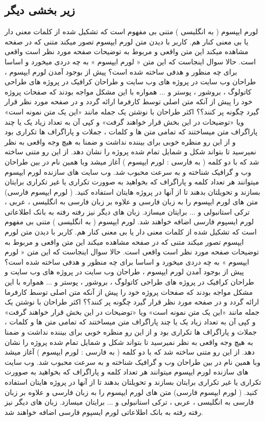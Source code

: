 \subsection{زیر بخشی دیگر}
لورم ایپسوم ( به انگلیسی  ) متنی بی مفهوم است که تشکیل شده از کلمات معنی دار یا بی معنی کنار هم. کاربر با دیدن متن لورم ایپسوم تصور میکند متنی که در صفحه مشاهده میکند این متن واقعی و مربوط به توضیحات صفحه مورد نظر است واقعی است. حالا سوال اینجاست که این متن « لورم ایپسوم » به چه دردی میخورد و اساسا برای چه منظور و هدفی ساخته شده است؟ پیش از بوجود آمدن لورم ایپسوم ، طراحان وب سایت در پروژه های وب سایت و طراحان کرافیک در پروژه های طراحی کاتولوگ ، بروشور ، پوستر و ... همواره با این مشکل مواجه بودند که صفحات پروژه خود را پیش از آنکه متن اصلی توسط کارفرما ارائه گردد و در صفحه مورد نظر قرار گیرد چگونه پر کنند؟؟ اکثر طراحان با نوشتن یک جمله مانند «این یک متن نمونه است» ویا «توضیحات در این بخش قرار خواهند گرفت» و کپی آن به تعداد زیاد یک یا چند پاراگراف متن میساختند که تمامی متن ها و کلمات ، جملات و پاراگراف ها تکراری بود و از این رو منظره خوبی برای بیننده نداشت و ضمنا به هیچ وجه واقعی به نظر نمیرسید تا بتواند شکل و شمایل تمام شده پروژه را نشان دهد. از این رو متنی ساخته شد که با دو کلمه ( به فارسی : لورم ایپسوم ) آغاز میشد وبا همین نام در بین طراحان وب و گرافیک شناخته و به سرعت محبوب شد. وب سایت های سازنده لورم ایپسوم میتوانند هر تعداد کلمه و پاراگراف که بخواهید به صوورت تکراری یا غیر تکراری برایتان بسازند و تحویلتان بدهند تا از آنها در پروژه هایتان استفاده کنید. ( لورم ایپسوم فارسی) متن های لورم ایپسوم را به زبان فارسی و علاوه بر زبان فارسی به انگلیسی ، عربی ، ترکی استانبولی و ... برایتان میسازد. زبان های دیگر نیز رفته رفته به بانک اطلاعاتی لورم ایسپوم فارسی اضافه خواهند شد.  لورم ایپسوم ( به انگلیسی  ) متنی بی مفهوم است که تشکیل شده از کلمات معنی دار یا بی معنی کنار هم. کاربر با دیدن متن لورم ایپسوم تصور میکند متنی که در صفحه مشاهده میکند این متن واقعی و مربوط به توضیحات صفحه مورد نظر است واقعی است. حالا سوال اینجاست که این متن « لورم ایپسوم » به چه دردی میخورد و اساسا برای چه منظور و هدفی ساخته شده است؟ پیش از بوجود آمدن لورم ایپسوم ، طراحان وب سایت در پروژه های وب سایت و طراحان کرافیک در پروژه های طراحی کاتولوگ ، بروشور ، پوستر و ... همواره با این مشکل مواجه بودند که صفحات پروژه خود را پیش از آنکه متن اصلی توسط کارفرما ارائه گردد و در صفحه مورد نظر قرار گیرد چگونه پر کنند؟؟ اکثر طراحان با نوشتن یک جمله مانند «این یک متن نمونه است» ویا «توضیحات در این بخش قرار خواهند گرفت» و کپی آن به تعداد زیاد یک یا چند پاراگراف متن میساختند که تمامی متن ها و کلمات ، جملات و پاراگراف ها تکراری بود و از این رو منظره خوبی برای بیننده نداشت و ضمنا به هیچ وجه واقعی به نظر نمیرسید تا بتواند شکل و شمایل تمام شده پروژه را نشان دهد. از این رو متنی ساخته شد که با دو کلمه ( به فارسی : لورم ایپسوم ) آغاز میشد وبا همین نام در بین طراحان وب و گرافیک شناخته و به سرعت محبوب شد. وب سایت های سازنده لورم ایپسوم میتوانند هر تعداد کلمه و پاراگراف که بخواهید به صوورت تکراری یا غیر تکراری برایتان بسازند و تحویلتان بدهند تا از آنها در پروژه هایتان استفاده کنید. ( لورم ایپسوم فارسی) متن های لورم ایپسوم را به زبان فارسی و علاوه بر زبان فارسی به انگلیسی ، عربی ، ترکی استانبولی و ... برایتان میسازد. زبان های دیگر نیز رفته رفته به بانک اطلاعاتی لورم ایسپوم فارسی اضافه خواهند شد.  

